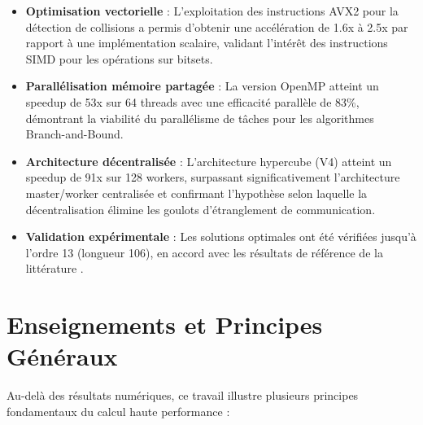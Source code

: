 \documentclass[12pt,a4paper,twoside]{report}
\begin{document}
\begin{itemize}
    \item \textbf{Optimisation vectorielle} : L'exploitation des instructions AVX2 pour la détection de collisions a permis d'obtenir une accélération de 1.6x à 2.5x par rapport à une implémentation scalaire, validant l'intérêt des instructions SIMD pour les opérations sur bitsets.

    \item \textbf{Parallélisation mémoire partagée} : La version OpenMP atteint un speedup de 53x sur 64 threads avec une efficacité parallèle de 83\%, démontrant la viabilité du parallélisme de tâches pour les algorithmes Branch-and-Bound.

    \item \textbf{Architecture décentralisée} : L'architecture hypercube (V4) atteint un speedup de 91x sur 128 workers, surpassant significativement l'architecture master/worker centralisée et confirmant l'hypothèse selon laquelle la décentralisation élimine les goulots d'étranglement de communication.

    \item \textbf{Validation expérimentale} : Les solutions optimales ont été vérifiées jusqu'à l'ordre 13 (longueur 106), en accord avec les résultats de référence de la littérature \cite{oeis}.
\end{itemize}

\section{Enseignements et Principes Généraux}

Au-delà des résultats numériques, ce travail illustre plusieurs principes fondamentaux du calcul haute performance :
\end{document}
